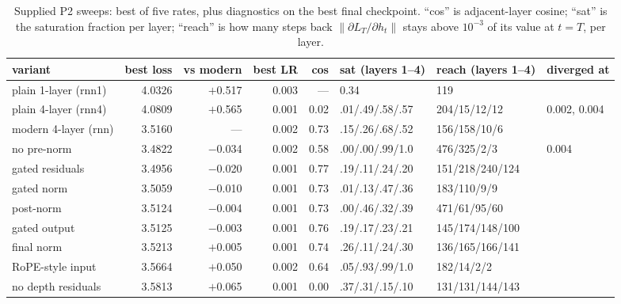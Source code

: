 \documentclass[10pt,letterpaper]{article}
\begin{document}
\begin{table}[H]\centering\small
\caption{Supplied P2 sweeps: best of five rates, plus diagnostics on the best final checkpoint. ``cos'' is adjacent-layer cosine; ``sat'' is the saturation fraction per layer; ``reach'' is how many steps back $\|\partial L_T/\partial h_t\|$ stays above $10^{-3}$ of its value at $t=T$, per layer.}\label{tab:p2}
\begin{tabular}{lrrrrlll}
\toprule
variant & best loss & vs modern & best LR & cos & sat (layers 1--4) & reach (layers 1--4) & diverged at \\
\midrule
plain 1-layer (rnn1) & 4.0326 & $+$0.517 & 0.003 & --- & 0.34 & 119 & \\
plain 4-layer (rnn4) & 4.0809 & $+$0.565 & 0.001 & 0.02 & .01/.49/.58/.57 & 204/15/12/12 & 0.002, 0.004 \\
modern 4-layer (rnn) & 3.5160 & ---      & 0.002 & 0.73 & .15/.26/.68/.52 & 156/158/10/6 & \\
no pre-norm        & 3.4822 & $-$0.034 & 0.002 & 0.58 & .00/.00/.99/1.0 & 476/325/2/3 & 0.004 \\
gated residuals    & 3.4956 & $-$0.020 & 0.001 & 0.77 & .19/.11/.24/.20 & 151/218/240/124 & \\
gated norm         & 3.5059 & $-$0.010 & 0.001 & 0.73 & .01/.13/.47/.36 & 183/110/9/9 & \\
post-norm          & 3.5124 & $-$0.004 & 0.001 & 0.73 & .00/.46/.32/.39 & 471/61/95/60 & \\
gated output       & 3.5125 & $-$0.003 & 0.001 & 0.76 & .19/.17/.23/.21 & 145/174/148/100 & \\
final norm         & 3.5213 & $+$0.005 & 0.001 & 0.74 & .26/.11/.24/.30 & 136/165/166/141 & \\
RoPE-style input   & 3.5664 & $+$0.050 & 0.002 & 0.64 & .05/.93/.99/1.0 & 182/14/2/2 & \\
no depth residuals & 3.5813 & $+$0.065 & 0.001 & 0.00 & .37/.31/.15/.10 & 131/131/144/143 & \\
\bottomrule
\end{tabular}
\end{table}
\end{document}

